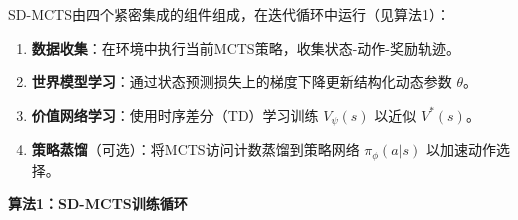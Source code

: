 \documentclass[UTF8]{ctexart}
\providecommand{\tightlist}{%
  \setlength{\itemsep}{0pt}\setlength{\parskip}{0pt}}
\begin{document}
SD-MCTS由四个紧密集成的组件组成，在迭代循环中运行（见算法1）：

\begin{enumerate}
\def\labelenumi{\arabic{enumi}.}
\tightlist
\item
  \textbf{数据收集}：在环境中执行当前MCTS策略，收集状态-动作-奖励轨迹。
\item
  \textbf{世界模型学习}：通过状态预测损失上的梯度下降更新结构化动态参数
  \(\theta\)。
\item
  \textbf{价值网络学习}：使用时序差分（TD）学习训练 \(V_\psi(s)\) 以近似
  \(V^*(s)\)。
\item
  \textbf{策略蒸馏}（可选）：将MCTS访问计数蒸馏到策略网络
  \(\pi_\phi(a|s)\) 以加速动作选择。
\end{enumerate}

\textbf{算法1：SD-MCTS训练循环}
\end{document}
